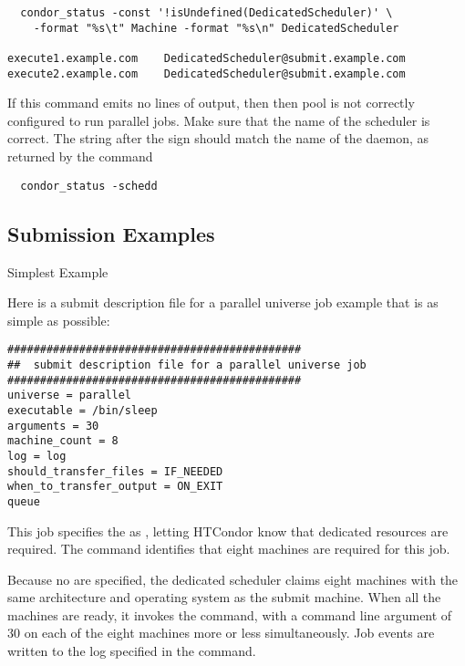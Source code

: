 \footnotesize
\begin{verbatim}
  condor_status -const '!isUndefined(DedicatedScheduler)' \
	-format "%s\t" Machine -format "%s\n" DedicatedScheduler

execute1.example.com	DedicatedScheduler@submit.example.com
execute2.example.com	DedicatedScheduler@submit.example.com

\end{verbatim}
\normalsize

If this command emits no lines of output, then then pool is
not correctly configured to run parallel jobs.
Make sure that the name of the scheduler is correct. 
The string after the  sign should match the name of the 
\Condor{schedd} daemon, as returned by the command

\begin{verbatim}
  condor_status -schedd
\end{verbatim}

\subsection{\label{sec:parallel-submit}Submission Examples}

\begin{description}
\item[Simplest Example]
\end{description}

Here is a submit description file for a parallel universe
job example that is as simple as possible:

\begin{verbatim}
#############################################
##  submit description file for a parallel universe job
#############################################
universe = parallel
executable = /bin/sleep
arguments = 30
machine_count = 8
log = log
should_transfer_files = IF_NEEDED
when_to_transfer_output = ON_EXIT
queue 
\end{verbatim}

This job specifies the  as , letting
HTCondor know that dedicated resources are required.  The
 command identifies that eight machines are
required for this job. 

Because no  are specified,
the dedicated scheduler claims eight machines 
with the same architecture and operating system as the submit machine.
When all the machines are ready, it invokes the
 command, with a command line argument of 30
on each of the eight machines more or less simultaneously.
Job events are written to the log specified in the  command.

